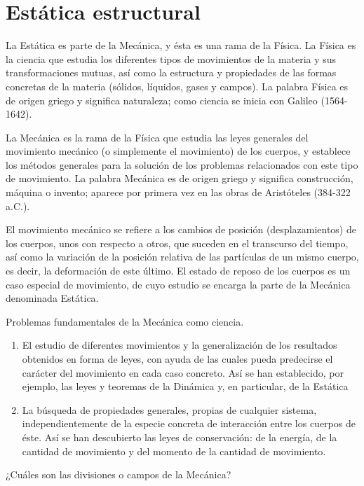 \chapter{Estática estructural}

La Estática es parte de la Mecánica, y ésta es una rama de la Física.
La Física es la ciencia que estudia los diferentes tipos de movimientos de la materia y sus
transformaciones mutuas, así como la estructura y propiedades de las formas concretas de la
materia (sólidos, líquidos, gases y campos). La palabra Física es de origen griego y significa
naturaleza; como ciencia se inicia con Galileo (1564-1642).


La Mecánica es la rama de la Física que estudia las leyes generales del movimiento mecánico (o
simplemente el movimiento) de los cuerpos, y establece los métodos generales para la solución
de los problemas relacionados con este tipo de movimiento. La palabra Mecánica es de origen
griego y significa construcción, máquina o invento; aparece por primera vez en las obras de
Aristóteles (384-322 a.C.).

El movimiento mecánico se refiere a los cambios de posición (desplazamientos) de los cuerpos,
unos con respecto a otros, que suceden en el transcurso del tiempo, así como la variación de la
posición relativa de las partículas de un mismo cuerpo, es decir, la deformación de este último.
El estado de reposo de los cuerpos es un caso especial de movimiento, de cuyo estudio se encarga
la parte de la Mecánica denominada Estática.


Problemas fundamentales de la Mecánica como ciencia.

\begin{enumerate}
	\item El estudio de diferentes movimientos y la generalización de los resultados obtenidos en forma de leyes, con ayuda de las cuales pueda predecirse el carácter del movimiento en cada caso concreto. Así se han establecido, por ejemplo, las leyes y teoremas de la Dinámica y, en particular, de la Estática
	\item La búsqueda de propiedades generales, propias de cualquier sistema, independientemente de la especie concreta de interacción entre los cuerpos de éste. Así se han descubierto las leyes de conservación: de la energía, de la cantidad de movimiento y del momento de la cantidad de movimiento.
\end{enumerate}


¿Cuáles son las divisiones o campos de la Mecánica?

